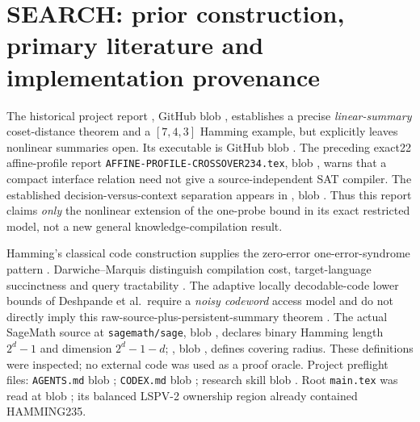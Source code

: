 \documentclass[10pt]{article}
\begin{document}
\section{SEARCH: prior construction, primary literature and implementation provenance}
The historical project report , GitHub blob \texttt{}, establishes a precise \emph{linear-summary} coset-distance theorem and a $[7,4,3]$ Hamming example, but explicitly leaves nonlinear summaries open. Its executable is GitHub blob \texttt{}. The preceding exact22 affine-profile report \texttt{AFFINE-PROFILE-CROSSOVER234.tex}, blob \texttt{}, warns that a compact interface relation need not give a source-independent SAT compiler. The established decision-versus-context separation appears in , blob \texttt{}. Thus this report claims \emph{only} the nonlinear extension of the one-probe bound in its exact restricted model, not a new general knowledge-compilation result.

Hamming's classical code construction supplies the zero-error one-error-syndrome pattern \cite{hamming1950}. Darwiche--Marquis distinguish compilation cost, target-language succinctness and query tractability \cite{darwiche2002}. The adaptive locally decodable-code lower bounds of Deshpande et al.\ require a \emph{noisy codeword} access model and do not directly imply this raw-source-plus-persistent-summary theorem \cite{deshpande2005}. The actual SageMath source  at \texttt{sagemath/sage}, blob \texttt{}, declares binary Hamming length $2^d-1$ and dimension $2^d-1-d$; , blob \texttt{}, defines covering radius. These definitions were inspected; no external code was used as a proof oracle. Project preflight files: \texttt{AGENTS.md} blob \texttt{}; \texttt{CODEX.md} blob \texttt{}; research skill blob \texttt{}. Root \texttt{main.tex} was read at blob \texttt{}; its balanced LSPV-2 ownership region already contained HAMMING235.
\end{document}

